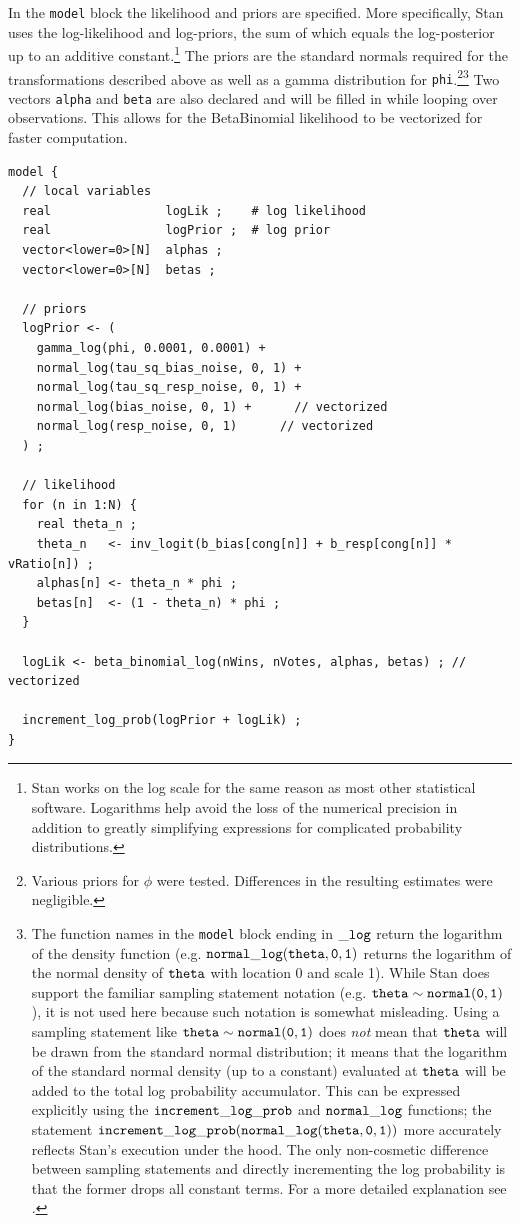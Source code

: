 In the {\tt model} block the likelihood and priors are specified. More specifically, Stan uses the log-likelihood and log-priors, the sum of which equals the log-posterior up to an additive constant.\footnote{Stan works on the log scale for the same reason as most other statistical software. Logarithms help avoid the loss of the numerical precision in addition to greatly simplifying expressions for complicated probability distributions.}
The priors are the standard normals required for the transformations described above as well as a gamma distribution for {\tt phi}.\footnote{Various priors for $\phi$ were tested. Differences in the resulting estimates were negligible.}\footnote{The function names in the {\tt model} block ending in ${\tt\_log}$ return the logarithm of the density function (e.g. ${\tt normal\_log(theta,0,1)}$ returns the logarithm of the normal density of ${\tt theta}$  with location 0 and scale 1). While Stan does support the familiar sampling statement notation (e.g. ${\tt theta \sim normal(0,1)}$), it is not used here because such notation is somewhat misleading. Using a sampling statement like ${\tt theta \sim normal(0,1)}$ does {\it not} mean that ${\tt theta}$ will be drawn from the standard normal distribution; it means that the logarithm of the standard normal density (up to a constant) evaluated at ${\tt theta}$ will be added to the total log probability accumulator. This can be expressed explicitly using the ${\tt increment\_log\_prob}$ and ${\tt normal\_log}$ functions; the statement ${\tt increment\_log\_prob(normal\_log(theta,0,1))}$ more accurately reflects Stan's execution under the hood. The only non-cosmetic difference between sampling statements and directly incrementing the log probability is that the former drops all constant terms. For a more detailed explanation see .} Two vectors {\tt alpha} and {\tt beta} are also declared and will be filled in while looping over observations. This allows for the BetaBinomial likelihood to be vectorized for faster computation.

\begin{singlespacing}
\small
\begin{verbatim}
model {
  // local variables
  real                logLik ;    # log likelihood
  real                logPrior ;  # log prior
  vector<lower=0>[N]  alphas ;
  vector<lower=0>[N]  betas ;

  // priors
  logPrior <- (
    gamma_log(phi, 0.0001, 0.0001) +
    normal_log(tau_sq_bias_noise, 0, 1) +
    normal_log(tau_sq_resp_noise, 0, 1) +
    normal_log(bias_noise, 0, 1) +  	// vectorized
    normal_log(resp_noise, 0, 1)  	  // vectorized
  ) ;

  // likelihood
  for (n in 1:N) {
    real theta_n ;
    theta_n   <- inv_logit(b_bias[cong[n]] + b_resp[cong[n]] * vRatio[n]) ;
    alphas[n] <- theta_n * phi ;
    betas[n]  <- (1 - theta_n) * phi ;
  }
  
  logLik <- beta_binomial_log(nWins, nVotes, alphas, betas) ; // vectorized

  increment_log_prob(logPrior + logLik) ; 
}
\end{verbatim}
\end{singlespacing}

